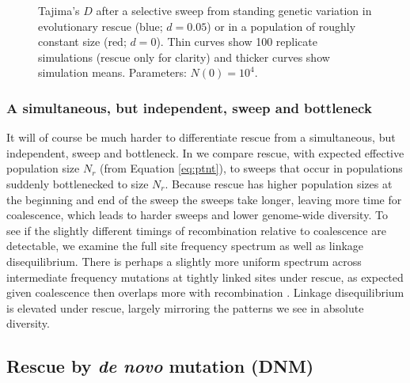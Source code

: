 \documentclass[]{article}
\begin{document}
\begin{figure}[htb]
\caption{
Tajima's $D$ after a selective sweep from standing genetic variation in evolutionary rescue (blue; $d=0.05$) or in a population of roughly constant size (red; $d=0$).
Thin curves show 100 replicate simulations (rescue only for clarity) and thicker curves show simulation means.
Parameters: $N(0)=10^4$.
}%
\label{fig:rescueSGV_tajimasD}
\end{figure}

\subsubsection*{A simultaneous, but independent, sweep and bottleneck}
\label{sec:sweep+bottleneck}

It will of course be much harder to differentiate rescue from a simultaneous, but independent, sweep and bottleneck.
In  we compare rescue, with expected effective population size $N_r$ (from Equation \ref{eq:ptnt}), to sweeps that occur in populations suddenly bottlenecked to size $N_r$.
Because rescue has higher population sizes at the beginning and end of the sweep the sweeps take longer, leaving more time for coalescence, which leads to harder sweeps and lower genome-wide diversity.
To see if the slightly different timings of recombination relative to coalescence are detectable, we examine the full site frequency spectrum as well as linkage disequilibrium.
There is perhaps a slightly more uniform spectrum across intermediate frequency mutations at tightly linked sites under rescue, as expected given coalescence then overlaps more with recombination \citep[similar to the effect of recurrent mutation][]{pennings2006soft}.
Linkage disequilibrium is elevated under rescue, largely mirroring the patterns we see in absolute diversity.

\subsection*{Rescue by \textit{de novo} mutation (DNM)}
\label{sec:rescue_forward_DNM}
\end{document}
